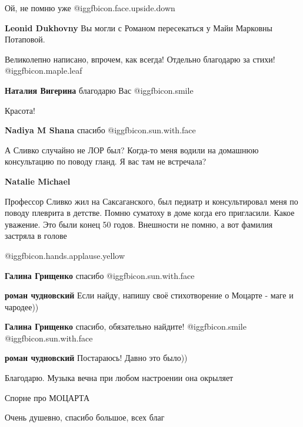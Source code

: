 \begin{itemize}
\begin{itemize}
Ой, не помню уже @igg{fbicon.face.upside.down} 

\textbf{Leonid Dukhovny} Вы могли с Романом пересекаться у Майи Марковны Потаповой.
\end{itemize} %

Великолепно написано, впрочем, как всегда! Отдельно благодарю за стихи! @igg{fbicon.maple.leaf} 

\textbf{Наталия Вигерина} благодарю Вас @igg{fbicon.smile} 

Красота!

\textbf{Nadiya M Shana} спасибо @igg{fbicon.sun.with.face} 


А Сливко случайно не ЛОР был? Когда-то меня водили на домашнюю консультацию по
поводу гланд. Я вас там не встречала?

\begin{itemize} %
\textbf{Natalie Michael} 

Профессор Сливко жил на Саксаганского, был педиатр и консультировал меня по
поводу плеврита в детстве. Помню суматоху в доме когда его пригласили. Какое
уважение. Это были конец 50 годов. Внешности не помню, а вот фамилия застряла в
голове

\end{itemize} %

 @igg{fbicon.hands.applause.yellow} 

\begin{itemize} %
\textbf{Галина Грищенко} спасибо @igg{fbicon.sun.with.face} 

\textbf{роман чудновский} Если найду, напишу своё стихотворение о Моцарте - маге и чародее))

\textbf{Галина Грищенко} спасибо, обязательно найдите! @igg{fbicon.smile}  @igg{fbicon.sun.with.face} 

\textbf{роман чудновский} Постараюсь! Давно это было))
\end{itemize} %

Благодарю. Музыка вечна при любом настроении она окрыляет

Спорне про МОЦАРТА

Очень душевно, спасибо большое, всех благ


\end{itemize}

